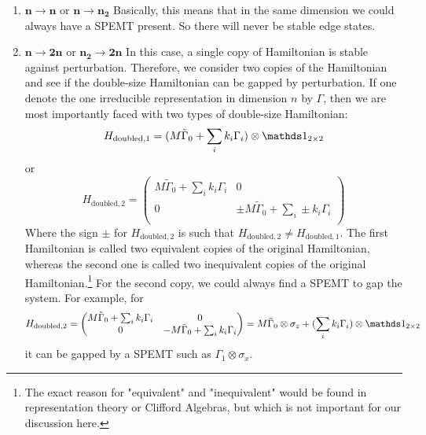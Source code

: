 \begin{enumerate}
    \item $\mathbf{n\to n}$ or $\mathbf{n\to n_2}$ Basically, this means that in
        the same dimension we could always have a SPEMT present. So there will
        never be stable edge states.
    \item 
    $\mathbf{n\to 2n}$ or $\mathbf{n_2\to 2n}$ In this case, a single copy of
    Hamiltonian is stable against perturbation. Therefore, we consider two copies of
    the Hamiltonian and see if the double-size Hamiltonian can be gapped by
    perturbation. If one denote the one irreducible representation in dimension $n$
    by $\Gamma$, then we are most importantly faced with two types of double-size
    Hamiltonian:
    \begin{equation}
        H_\mathrm{doubled,1} = (M\tilde{\Gamma}_0 + \sum_i k_i\Gamma_i
        )\otimes\id_{2\times 2}
    \end{equation}
    or
    \begin{equation}
        H_\mathrm{doubled,2} = \begin{pmatrix}
            M\tilde{\Gamma}_0 + \sum_i k_i\Gamma_i & 0 \\
            0 & \pm M\tilde{\Gamma}_0 + \sum_i \pm k_i\Gamma_i \\
        \end{pmatrix}
    \end{equation}
    Where the sign $\pm$ for $H_\mathrm{doubled,2}$ is such that
    $H_\mathrm{doubled,2}\neq H_\mathrm{doubled,1}$.  The first Hamiltonian is
    called two equivalent copies of the original Hamiltonian, whereas the second one
    is called two inequivalent copies of the original Hamiltonian.\footnote{The
    exact reason for "equivalent" and "inequivalent" would be found in
    representation theory or Clifford Algebras, but which is not important for
    our discussion here.} For the second copy, we could always find a SPEMT to gap
    the system. For example, for
    \begin{equation}
        H_\mathrm{doubled,2} = \begin{pmatrix}
            M\tilde{\Gamma}_0 + \sum_i k_i\Gamma_i & 0 \\
            0 & - M\tilde{\Gamma}_0 + \sum_i k_i\Gamma_i \\
        \end{pmatrix} =
        M\tilde{\Gamma}_0\otimes\sigma_z + 
            (\sum_i k_i\Gamma_i)\otimes\id_{2\times 2}
    \end{equation}
    it can be gapped by a SPEMT such as $\Gamma_1\otimes \sigma_x$. 


\end{enumerate}
